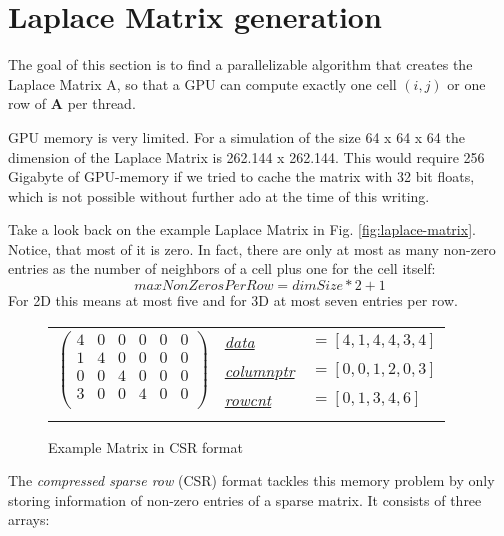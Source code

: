 \section{Laplace Matrix generation}
The goal of this section is to find a parallelizable algorithm that creates the Laplace Matrix A, so that a GPU can compute exactly one cell $(i,j)$ or one row of \textbf{A} per thread.
\par GPU memory is very limited. For a simulation of the size 64 x 64 x 64 the dimension of the Laplace Matrix is 262.144 x 262.144. This would require 256 Gigabyte of GPU-memory if we tried to cache the matrix with 32 bit floats, which is not possible without further ado at the time of this writing. 
\par Take a look back on the example Laplace Matrix in Fig. \ref{fig:laplace-matrix}. Notice, that most of it is zero. In fact, there are only at most as many non-zero entries as the number of neighbors of a cell plus one for the cell itself:
\begin{equation}
	maxNonZerosPerRow = dimSize * 2 + 1
\end{equation}
For 2D this means at most five and for 3D at most seven entries per row.
\newpage
\begin{figure*}
	\centering
	\begin{tabular}{lll}
	\multirow{3}{*}{$\left( {\begin{array}{cccccc}
   4 & 0 & 0 & 0 & 0 & 0  \\
   1 & 4 & 0 & 0 & 0 & 0  \\
   0 & 0 & 4 & 0 & 0 & 0  \\
   3 & 0 & 0 & 4 & 0 & 0  \\
  \end{array} } \right)$}
	& \hyperref[csr-data]{\textit{data}} & $=[4,1,4,4,3,4]$  \\
	& \hyperref[csr-columnptr]{\textit{columnptr}} & $=[0,0,1,2,0,3]$ \\
	& \hyperref[csr-rowcnt]{\textit{rowcnt}} & $=[0,1,3,4,6]$ \\
	& & 
	\end{tabular}
\caption{Example Matrix in CSR format}\label{fig:csr-matrix}
\end{figure*}
\par The \textit{compressed sparse row} (CSR) \parencite{tinney1967direct} format tackles this memory problem by only storing information of non-zero entries of a sparse matrix. It consists of three arrays:\\\\
